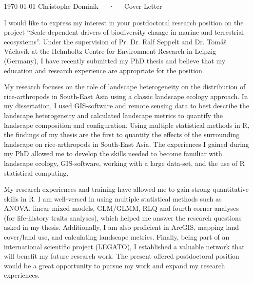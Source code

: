 \documentclass[11pt, a4paper]{awesome-cv}
\begin{document}
\makecvheader[R]

\makecvfooter
  {\today}
  {Christophe Dominik~~~·~~~Cover Letter}
  {}

\makelettertitle

\begin{cvletter}

I would like to express my interest in your postdoctoral research position on the project “Scale-dependent drivers of biodiversity change in marine and terrestrial
ecosystems”. Under the supervision of Pr. Dr. Ralf Seppelt and Dr. Tomáš Václavík at the Helmholtz Centre for Environment Research in Leipzig (Germany), I have recently submitted my PhD thesis and believe that my education and research experience are appropriate for the position. 

My research focuses on the role of landscape heterogeneity on the distribution of rice-arthropods in South-East Asia using a classic landscape ecology approach. In my dissertation, I used GIS-software 
and remote sensing data to best describe the landscape heterogeneity and calculated landscape metrics to quantify the landscape composition and configuration. Using multiple statistical methods in R, the findings of my thesis are the first to quantify the effects of the surrounding landscape on rice-arthropods in South-East Asia. The experiences I gained during my PhD allowed me to develop the skills needed to become familiar with landscape ecology, GIS-software, working with a large data-set, and the use of R statistical computing.

My research experiences and training have allowed me to gain strong quantitative skills in R. I am well-versed in using multiple statistical methods such as ANOVA, linear mixed models, GLM/GLMM, RLQ and fourth corner analyses (for life-history traits analyses), which helped me answer the research questions asked in my thesis. Additionally, I am also proficient in ArcGIS, mapping land cover/land use, and calculating landscape metrics. Finally, being part of an international scientific project (LEGATO), I established a valuable network that will benefit my future research work. The present offered postdoctoral position would be a great opportunity to pursue my work and expand my research experiences. 


\end{cvletter}
\end{document}
